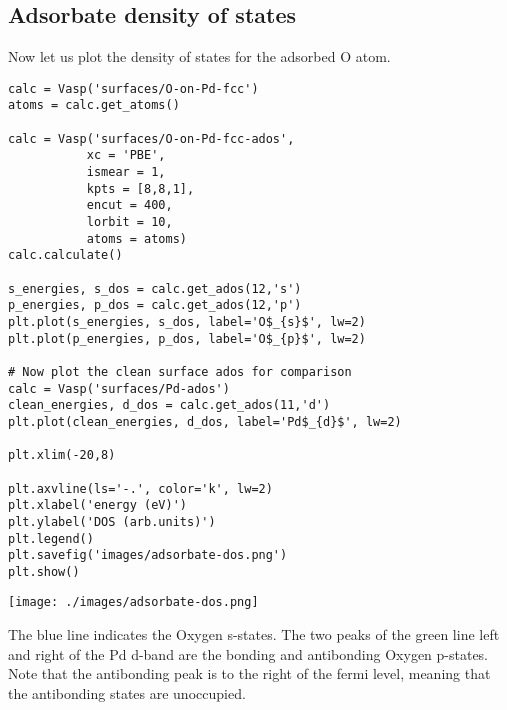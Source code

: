 \documentclass[11pt]{article}
\begin{document}
\subsection{Adsorbate density of states}
\label{sec:org4a61df7}

Now let us plot the density of states for the adsorbed O atom.

\begin{verbatim}
calc = Vasp('surfaces/O-on-Pd-fcc')
atoms = calc.get_atoms()

calc = Vasp('surfaces/O-on-Pd-fcc-ados',
           xc = 'PBE',
           ismear = 1,
           kpts = [8,8,1],
           encut = 400,
           lorbit = 10,
           atoms = atoms)
calc.calculate()

s_energies, s_dos = calc.get_ados(12,'s')
p_energies, p_dos = calc.get_ados(12,'p')
plt.plot(s_energies, s_dos, label='O$_{s}$', lw=2)
plt.plot(p_energies, p_dos, label='O$_{p}$', lw=2)

# Now plot the clean surface ados for comparison
calc = Vasp('surfaces/Pd-ados')
clean_energies, d_dos = calc.get_ados(11,'d')
plt.plot(clean_energies, d_dos, label='Pd$_{d}$', lw=2)

plt.xlim(-20,8)

plt.axvline(ls='-.', color='k', lw=2)
plt.xlabel('energy (eV)')
plt.ylabel('DOS (arb.units)')
plt.legend()
plt.savefig('images/adsorbate-dos.png')
plt.show()
\end{verbatim}

\begin{center}
\texttt{[image: ./images/adsorbate-dos.png]}
\end{center}

The blue line indicates the Oxygen s-states. The two peaks of the green line left and right of the Pd d-band are the bonding and antibonding Oxygen p-states. Note that the antibonding peak is to the right of the fermi level, meaning that the antibonding states are unoccupied.
\end{document}
